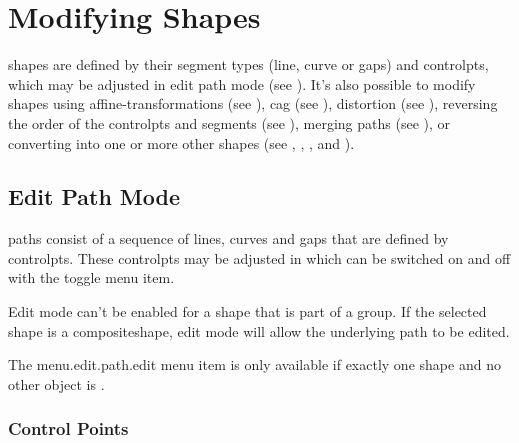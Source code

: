 \chapter{Modifying Shapes}\label{sec:modshape}

\Glspl{shape} are defined by their segment types (line, \gls{curve}
or \glspl{gap}) and \glspl{controlpt}, which may be adjusted in edit
path mode (see ). It's also possible to
modify \glspl{shape} using \glspl{affine-transformation} (see
), \gls{cag} (see ),
distortion (see ), reversing the order of
the \glspl{controlpt} and segments (see ), merging paths (see
), or converting into one or more other
\glspl{shape} (see ,
, ,
 and
). 

\section{Edit Path Mode}\label{sec:editpath}


\Glspl{path} consist of a sequence of lines, curves and \glspl{gap} 
that are defined by \glspl{controlpt}. These \glspl{controlpt} may be adjusted in
\emph{} which can be switched on and off
with the  toggle menu item.

\begin{information}
Edit mode can't be enabled for a \gls{shape} that is part of a \gls{group}.
If the selected shape is a \gls{compositeshape}, edit mode will allow the
underlying path to be edited.
\end{information}

The \gls{menu.edit.path.edit} menu item
is only available if exactly one \gls{shape} and no other
\gls{object} is \selected.


\subsection{Control Points}\label{sec:editcontrolpt}


